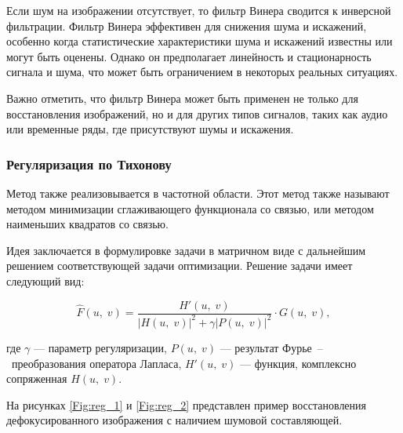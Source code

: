 Если шум на изображении отсутствует, то фильтр Винера сводится к инверсной фильтрации. Фильтр Винера эффективен для снижения шума и искажений, особенно когда статистические характеристики шума и искажений известны или могут быть оценены. Однако он предполагает линейность и стационарность сигнала и шума, что может быть ограничением в некоторых реальных ситуациях.

Важно отметить, что фильтр Винера может быть применен не только для восстановления изображений, но и для других типов сигналов, таких как аудио или временные ряды, где присутствуют шумы и искажения.

\subsubsection{Регуляризация по Тихонову}

Метод также реализовывается в частотной области. Этот метод также называют методом минимизации сглаживающего функционала со связью, или методом наименьших квадратов со связью.

Идея заключается в формулировке задачи в матричном виде с дальнейшим решением соответствующей задачи оптимизации. Решение задачи имеет следующий вид:

\begin{equation}
	\hat{F}(u,\;v) = \frac{H'(u,\;v)}{|H(u,\;v)|^2 + \gamma|P(u,\;v)|^2} \cdot G(u,\;v),
\end{equation}

где $\gamma$ --- параметр регуляризации, $P(u,\;v)$ --- результат Фурье~--~преобразования оператора Лапласа, $H'(u,\;v)$ --- функция, комплексно сопряженная $H(u,\;v)$.

На рисунках \ref{Fig:reg_1} и \ref{Fig:reg_2} представлен пример восстановления дефокусированного изображения с наличием шумовой составляющей.

